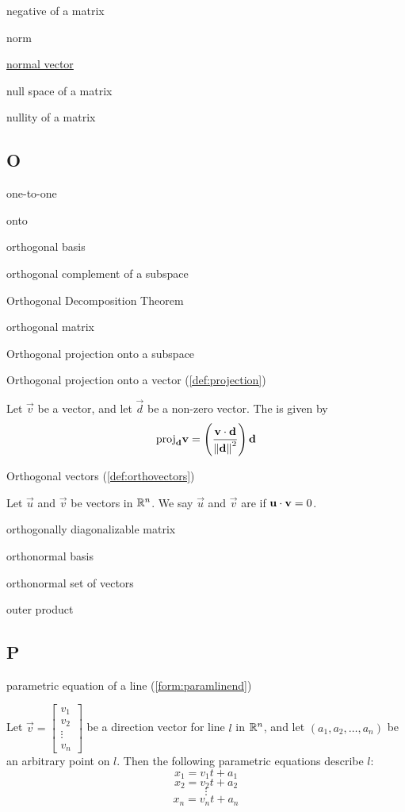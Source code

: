 \documentclass{ximera}
\begin{document}
negative of a matrix

norm

\href{https://ximera.osu.edu/oerlinalg/LinearAlgebra/RRN-0030/main}{normal vector}

null space of a matrix

nullity of a matrix


\subsection{O}
one-to-one

onto

orthogonal basis

orthogonal complement of a subspace

Orthogonal Decomposition Theorem

orthogonal matrix

Orthogonal projection onto a subspace

Orthogonal projection onto a vector (\ref{def:projection})
\begin{expandable}
    Let $\vec{v}$ be a vector, and let $\vec{d}$ be a non-zero vector.  The  is given by 
$$\mbox{proj}_{\mathbf{d}}\mathbf{v}=\left(\frac{\mathbf{v}\cdot\mathbf{d}}{\left\lVert\mathbf{d}\right\rVert^2}\right)\mathbf{d}$$
\end{expandable}

Orthogonal vectors (\ref{def:orthovectors}) 
\begin{expandable}
Let $\vec{u}$ and $\vec{v}$ be vectors in $\mathbb{R}^n$. We say $\vec{u}$ and $\vec{v}$ are  if $\mathbf{u}\cdot \mathbf{v}=0$.
\end{expandable}


orthogonally diagonalizable matrix

orthonormal basis

orthonormal set of vectors

outer product



\subsection{P}



parametric equation of a line (\ref{form:paramlinend})
\begin{expandable}
    Let $\vec{v}=\begin{bmatrix}v_1\\v_2\\\vdots\\v_n\end{bmatrix}$ be a direction vector for line $l$ in $\mathbb{R}^n$, and let $(a_1, a_2,\ldots , a_n)$ be an arbitrary point on $l$.  Then the following parametric equations describe $l$:
\[
x_1=v_1t+a_1\]
\[x_2=v_2t+a_2\]
\[\vdots\]
\[x_n=v_nt+a_n
\]
\end{expandable}
\end{document}
